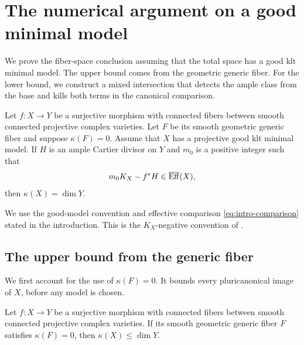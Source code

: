 \section{The numerical argument on a good minimal model}
\label{sec:geometry}

We prove the fiber-space conclusion assuming that the total space has
a good klt minimal model. The upper bound comes from the geometric
generic fiber. For the lower bound, we construct a mixed intersection
that detects the ample class from the base and kills both terms in
the canonical comparison.

\begin{theorem}\label{thm:good-model-case}
Let $f\colon X\to Y$ be a surjective morphism with connected fibers
between smooth connected projective complex varieties. Let $F$ be its
smooth geometric generic fiber and suppose $\kappa(F)=0$. Assume
that $X$ has a projective good klt minimal model. If $H$ is an ample
Cartier divisor on $Y$ and $m_0$ is a positive integer such that
\begin{equation}\label{eq:geometric-numerical-hypothesis}
 m_0K_X-f^*H\in\overline{\operatorname{Eff}}(X),
\end{equation}
then $\kappa(X)=\dim Y$.
\end{theorem}

We use the good-model convention and effective comparison
\eqref{eq:intro-comparison} stated in the introduction. This is the
$K_X$-negative convention of \cite[Definitions~3.6.1 and~3.6.7]{BCHM2010}.

\subsection{The upper bound from the generic fiber}

We first account for the use of $\kappa(F)=0$. It bounds every
pluricanonical image of $X$, before any model is chosen.

\begin{lemma}\label{lem:easy-addition}
Let $f\colon X\to Y$ be a surjective morphism with connected fibers
between smooth connected projective complex varieties. If its smooth
geometric generic fiber $F$ satisfies $\kappa(F)=0$, then
$\kappa(X)\leq\dim Y$.
\end{lemma}

